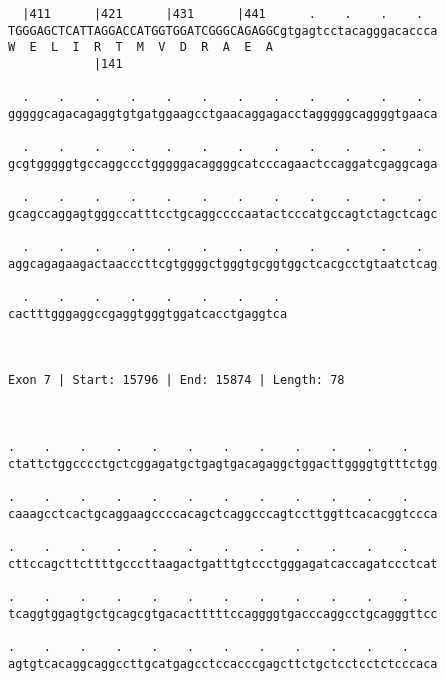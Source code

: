 \documentclass{article}
\begin{document}
\begin{Verbatim}
  |411      |421      |431      |441      .    .    .    .  
TGGGAGCTCATTAGGACCATGGTGGATCGGGCAGAGGCgtgagtcctacagggacaccca
W  E  L  I  R  T  M  V  D  R  A  E  A                       
            |141                                            
  
  .    .    .    .    .    .    .    .    .    .    .    .  
gggggcagacagaggtgtgatggaagcctgaacaggagacctagggggcaggggtgaaca
                                                            
  .    .    .    .    .    .    .    .    .    .    .    .  
gcgtgggggtgccaggccctgggggacaggggcatcccagaactccaggatcgaggcaga
                                                            
  .    .    .    .    .    .    .    .    .    .    .    .  
gcagccaggagtgggccatttcctgcaggccccaatactcccatgccagtctagctcagc
                                                            
  .    .    .    .    .    .    .    .    .    .    .    .  
aggcagagaagactaacccttcgtggggctgggtgcggtggctcacgcctgtaatctcag
                                                            
  .    .    .    .    .    .    .    . 
cactttgggaggccgaggtgggtggatcacctgaggtca
                                       
                                       
 
Exon 7 | Start: 15796 | End: 15874 | Length: 78



.    .    .    .    .    .    .    .    .    .    .    .    
ctattctggcccctgctcggagatgctgagtgacagaggctggacttggggtgtttctgg
                                                            
.    .    .    .    .    .    .    .    .    .    .    .    
caaagcctcactgcaggaagccccacagctcaggcccagtccttggttcacacggtccca
                                                            
.    .    .    .    .    .    .    .    .    .    .    .    
cttccagcttcttttgcccttaagactgatttgtccctgggagatcaccagatccctcat
                                                            
.    .    .    .    .    .    .    .    .    .    .    .    
tcaggtggagtgctgcagcgtgacactttttccaggggtgacccaggcctgcagggttcc
                                                            
.    .    .    .    .    .    .    .    .    .    .    .    
agtgtcacaggcaggccttgcatgagcctccacccgagcttctgctcctcctctcccaca
                                                            

\end{Verbatim}
\end{document}
